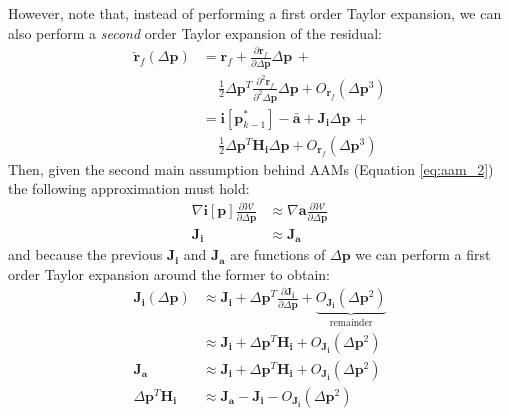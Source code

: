 However, note that, instead of performing a first order Taylor expansion, we can also perform a \emph{second} order Taylor expansion of the residual:
\begin{equation}
    \begin{aligned}
		\check{\mathbf{r}}_f(\Delta\mathbf{p}) & = \mathbf{r}_f + \frac{\partial \mathbf{r}_f}{\partial\Delta \mathbf{p}}\Delta\mathbf{p} \,+
		\\
		& \quad \, \frac{1}{2} \Delta\mathbf{p}^T\frac{\partial^2 \mathbf{r}_f}{\partial^2\Delta \mathbf{p}}\Delta\mathbf{p} + O_{\mathbf{r}_f}(\Delta\mathbf{p}^3)
		\\
		& = \mathbf{i}[\mathbf{p}_{k-1}^*] - \bar{\mathbf{a}} + \mathbf{J}_\mathbf{i}\Delta\mathbf{p} \, +
		\\
		& \quad \, \frac{1}{2} \Delta\mathbf{p}^T\mathbf{H}_\mathbf{i}\Delta\mathbf{p} + O_{\mathbf{r}_f}(\Delta\mathbf{p}^3)
    \label{eq:po_forward_residual_taylor2}
    \end{aligned}
\end{equation}
Then, given the second main assumption behind AAMs (Equation \ref{eq:aam_2}) the following approximation must hold:
\begin{equation}
	\begin{aligned}
		\nabla\mathbf{i}[\mathbf{p}] \frac{\partial\mathcal{W}}{\partial\Delta\mathbf{p}} & \approx \nabla\mathbf{a} \frac{\partial\mathcal{W}}{\partial\Delta\mathbf{p}}
		\\
		\mathbf{J}_\mathbf{i} & \approx \mathbf{J}_\mathbf{a}
		\label{eq:jacobian_aproximation}
	\end{aligned}
\end{equation}
and because the previous $\mathbf{J}_\mathbf{i}$ and $\mathbf{J}_\mathbf{a}$ are functions of $\Delta\mathbf{p}$ we can perform a first order Taylor expansion around the former to obtain:
\begin{equation}
	\begin{aligned}
	\mathbf{J}_\mathbf{i} (\Delta\mathbf{p}) & \approx \mathbf{J}_\mathbf{i} + \Delta\mathbf{p}^T \frac{\partial\mathbf{J}_\mathbf{i}}{\partial\Delta\mathbf{p}} + \underbrace{O_{\mathbf{J}_\mathbf{i}}(\Delta\mathbf{p}^2)}_{\textrm{remainder}}
	\\
	& \approx \mathbf{J}_\mathbf{i} + \Delta\mathbf{p}^T \mathbf{H}_\mathbf{i} + O_{\mathbf{J}_\mathbf{i}}(\Delta\mathbf{p}^2)
	\\
	\mathbf{J}_\mathbf{a} & \approx  \mathbf{J}_\mathbf{i} + \Delta\mathbf{p}^T \mathbf{H}_\mathbf{i} + O_{\mathbf{J}_\mathbf{i}}(\Delta\mathbf{p}^2)
	\\
	\Delta\mathbf{p}^T \mathbf{H}_\mathbf{i} & \approx \mathbf{J}_\mathbf{a} - \mathbf{J}_\mathbf{i} - O_{\mathbf{J}_\mathbf{i}}(\Delta\mathbf{p}^2)
	\label{eq:jacobian_taylor}
	\end{aligned}
\end{equation}

